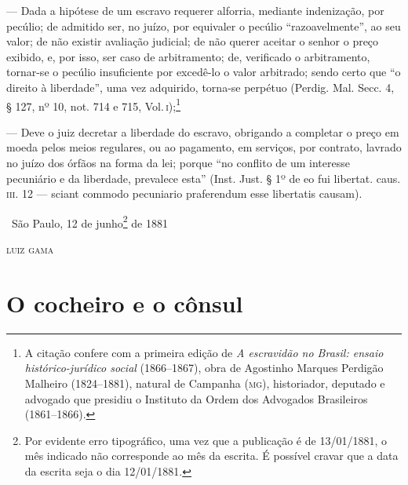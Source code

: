 {--- Dada a hipótese de um escravo requerer alforria, mediante
indenização, por pecúlio; de admitido ser, no juízo, por equivaler o
pecúlio ``razoavelmente'', ao seu valor; de não existir avaliação
judicial; de não querer aceitar o senhor o preço exibido, e, por isso,
ser caso de arbitramento; de, verificado o arbitramento, tornar-se o
pecúlio insuficiente por excedê-lo o valor arbitrado; sendo certo que ``o
direito à liberdade'', uma vez adquirido, torna-se perpétuo (Perdig. Mal.
Secc. 4, § 127, nº 10, not. 714 e 715, Vol.\,\textsc{i});\footnote{A citação
  confere com a primeira edição de \emph{A escravidão no Brasil: ensaio
  histórico-jurídico social} (1866--1867), obra de Agostinho Marques
  Perdigão Malheiro (1824--1881), natural de Campanha (\textsc{mg}), historiador,
  deputado e advogado que presidiu o Instituto da Ordem dos Advogados
  Brasileiros (1861--1866).}

--- Deve o juiz decretar a liberdade do escravo, obrigando a completar
o preço em moeda pelos meios regulares, ou ao pagamento, em serviços,
por contrato, lavrado no juízo dos órfãos na forma da lei; porque ``no
conflito de um interesse pecuniário e da liberdade, prevalece esta''
(Inst. Just. § 1º de eo fui libertat. caus. \textsc{iii}. 12 --- sciant commodo
pecuniario praferendum esse libertatis causam). %

\medskip

\hfill\ São Paulo, 12 de junho\footnote{Por evidente erro tipográfico, uma
    vez que a publicação é de 13/01/1881, o mês indicado não corresponde
    ao mês da escrita. É possível cravar que a data da escrita seja o
    dia 12/01/1881.} de 1881

\hfill\textsc{luiz gama}

\part{O cocheiro e o cônsul}

}
